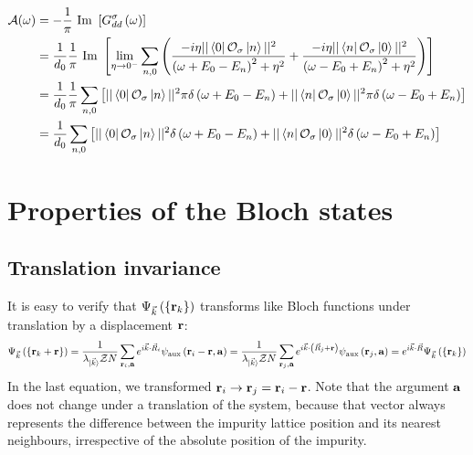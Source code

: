 \documentclass[reprint,hidelinks,onecolumn]{revtex4-2}
\begin{document}
\begin{equation}\begin{aligned}
	\mathcal{A(\omega)} &= -\frac{1}{\pi}\text{ Im }\left[G_{dd}^\sigma\left( \omega \right) \right] \\
			    &= \frac{1}{d_0}\frac{1}{\pi}\text{ Im }\left[\lim_{\eta \to 0^-}\sum_{n,0}\left(\frac{-i\eta ||\bra{0}\mathcal{O}_{\sigma}\ket{n}||^2}{\left(\omega + E_0 - E_n\right)^2 + \eta^2} + \frac{-i\eta ||\bra{n}\mathcal{O}_{\sigma}\ket{0}||^2}{\left(\omega - E_0 + E_n\right)^2 + \eta^2}\right)\right]\\
			    &= \frac{1}{d_0}\frac{1}{\pi}\sum_{n,0}\left[||\bra{0}\mathcal{O}_{\sigma}\ket{n}||^2\pi\delta\left(\omega + E_0 - E_n\right) + ||\bra{n}\mathcal{O}_{\sigma}\ket{0}||^2\pi\delta\left(\omega - E_0 + E_n\right)\right]\\
			    &= \frac{1}{d_0}\sum_{n,0}\left[||\bra{0}\mathcal{O}_{\sigma}\ket{n}||^2\delta\left(\omega + E_0 - E_n\right) + ||\bra{n}\mathcal{O}_{\sigma}\ket{0}||^2\delta\left(\omega - E_0 + E_n\right)\right]\\
\end{aligned}\end{equation}

\section{Properties of the Bloch states}

\subsection{Translation invariance}
It is easy to verify that \(\Psi_{\vec k}\left(\left\{ {\bf r}_k \right\}  \right) \) transforms like Bloch functions under translation by a displacement \({\bf r}\):
\begin{equation}\begin{aligned}
	\Psi_{\vec k}\left(\left\{{\bf r}_k + {\bf r}\right\} \right) = \frac{1}{\lambda_{\ket{\vec k}} \mathcal{Z} N}\sum_{{\bf r}_i,{\bf a}} e^{i \vec{k}\cdot\vec{R}_i} \psi_\text{aux}\left({\bf r}_i - {\bf r}, {\bf a}\right) = \frac{1}{\lambda_{\ket{\vec k}} \mathcal{Z} N}\sum_{{\bf r}_j, {\bf a}} e^{i \vec{k}\cdot\left(\vec{R}_j + {\bf r}\right)} \psi_\text{aux}\left({\bf r}_j, {\bf a}\right) = e^{i \vec{k}\cdot\vec{R}} \Psi_{\vec k}\left(\left\{ {\bf r}_k \right\} \right)
\end{aligned}\end{equation}
In the last equation, we transformed \({\bf r}_i \to {\bf r}_j = {\bf r}_i - {\bf r}\). Note that the argument \({\bf a}\) does not change under a translation of the system, because that vector always represents the difference between the impurity lattice position and its nearest neighbours, irrespective of the absolute position of the impurity.
\end{document}
